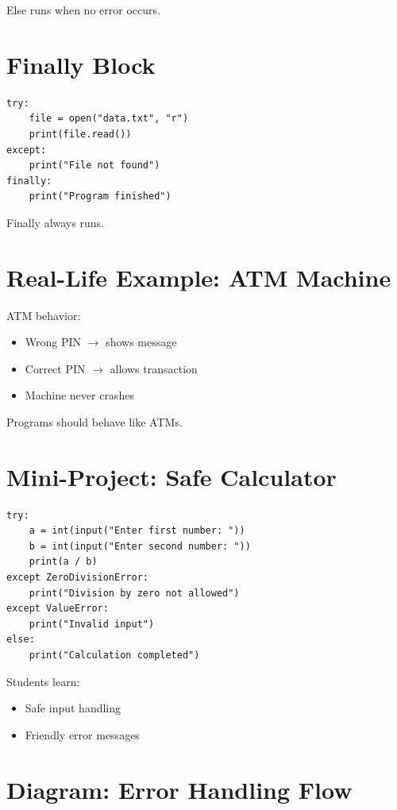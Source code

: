 Else runs when no error occurs.

\section{Finally Block}

\begin{verbatim}
try:
    file = open("data.txt", "r")
    print(file.read())
except:
    print("File not found")
finally:
    print("Program finished")
\end{verbatim}

Finally always runs.

\section{Real-Life Example: ATM Machine}

ATM behavior:
\begin{itemize}
    \item Wrong PIN $\rightarrow$ shows message
    \item Correct PIN $\rightarrow$ allows transaction
    \item Machine never crashes
\end{itemize}

Programs should behave like ATMs.

\section{Mini-Project: Safe Calculator}

\begin{verbatim}
try:
    a = int(input("Enter first number: "))
    b = int(input("Enter second number: "))
    print(a / b)
except ZeroDivisionError:
    print("Division by zero not allowed")
except ValueError:
    print("Invalid input")
else:
    print("Calculation completed")
\end{verbatim}

Students learn:
\begin{itemize}
    \item Safe input handling
    \item Friendly error messages
\end{itemize}

\section{Diagram: Error Handling Flow}

